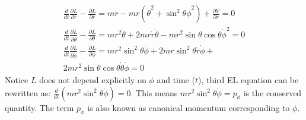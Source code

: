 \documentclass[conference]{IEEEtran}
\begin{document}
\begin{equation}
\begin{array}{l}
\frac{d}{d t} \frac{\partial L}{\partial \dot{r}}-\frac{\partial L}{\partial r}=m \ddot{r}-m r\left(\dot{\theta}^{2}+\sin ^{2} \theta \dot{\phi}^{2}\right)+\frac{\partial V}{\partial r}=0 \\
\frac{d}{d t} \frac{\partial L}{\partial \dot{\theta}}-\frac{\partial L}{\partial \theta}=m r^{2} \ddot{\theta}+2 m r \dot{r} \dot{\theta}-m r^{2} \sin \theta \cos \theta \dot{\phi}^{2}=0\\
\frac{d}{d t} \frac{\partial L}{\partial \dot{\phi}}-\frac{\partial L}{\partial \phi}=m r^{2} \sin ^{2} \theta \ddot{\phi}+ 2 m r \sin ^{2} \theta \dot{r} \dot{\phi}+ \\ 2 m r^{2} \sin \theta \cos \theta \dot{\theta} \dot{\phi}=0
\end{array}
\end{equation}
Notice $L$ does not depend explicitly on $\phi$ and time ($t$), third EL equation can be rewritten as:
$\frac{d}{d t}\left(mr^{2}\sin^{2}\theta \dot{\phi}\right) = 0$. This means $mr^{2}\sin^{2}\theta \dot{\phi} = p_{\phi}$ is the conserved quantity. The term $p_{\phi}$ is also known as canonical momentum corresponding to $\phi$.
\vspace{1em}
\end{document}
